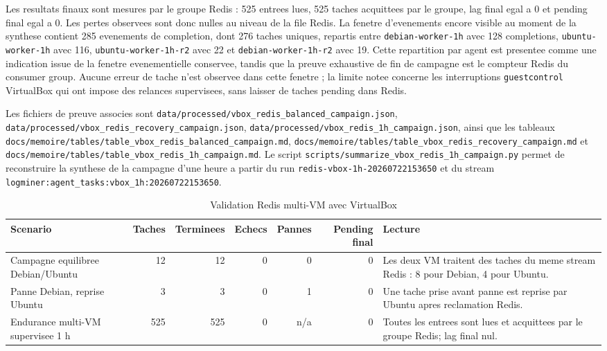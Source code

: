 Les resultats finaux sont mesures par le groupe Redis : 525 entrees lues, 525 taches acquittees par le groupe, lag final egal a 0 et pending final egal a 0. Les pertes observees sont donc nulles au niveau de la file Redis. La fenetre d'evenements encore visible au moment de la synthese contient 285 evenements de completion, dont 276 taches uniques, repartis entre \texttt{debian-worker-1h} avec 128 completions, \texttt{ubuntu-worker-1h} avec 116, \texttt{ubuntu-worker-1h-r2} avec 22 et \texttt{debian-worker-1h-r2} avec 19. Cette repartition par agent est presentee comme une indication issue de la fenetre evenementielle conservee, tandis que la preuve exhaustive de fin de campagne est le compteur Redis du consumer group. Aucune erreur de tache n'est observee dans cette fenetre ; la limite notee concerne les interruptions \texttt{guestcontrol} VirtualBox qui ont impose des relances supervisees, sans laisser de taches pending dans Redis.

Les fichiers de preuve associes sont \texttt{data/processed/vbox\_redis\_balanced\_campaign.json}, \texttt{data/processed/vbox\_redis\_recovery\_campaign.json}, \texttt{data/processed/vbox\_redis\_1h\_campaign.json}, ainsi que les tableaux \texttt{docs/memoire/tables/table\_vbox\_redis\_balanced\_campaign.md}, \texttt{docs/memoire/tables/table\_vbox\_redis\_recovery\_campaign.md} et \texttt{docs/memoire/tables/table\_vbox\_redis\_1h\_campaign.md}. Le script \texttt{scripts/summarize\_vbox\_redis\_1h\_campaign.py} permet de reconstruire la synthese de la campagne d'une heure a partir du run \texttt{redis-vbox-1h-20260722153650} et du stream \texttt{logminer:agent\_tasks:vbox\_1h:20260722153650}.

\begin{table}[H]
\centering
\caption{Validation Redis multi-VM avec VirtualBox}
\label{tab:vbox-redis-multivm}
\scriptsize
\begin{tabularx}{\textwidth}{p{3.2cm}rrrrrX}
\toprule
\textbf{Scenario} & \textbf{Taches} & \textbf{Terminees} & \textbf{Echecs} & \textbf{Pannes} & \textbf{Pending final} & \textbf{Lecture} \\
\midrule
Campagne equilibree Debian/Ubuntu & 12 & 12 & 0 & 0 & 0 & Les deux VM traitent des taches du meme stream Redis : 8 pour Debian, 4 pour Ubuntu. \\
Panne Debian, reprise Ubuntu & 3 & 3 & 0 & 1 & 0 & Une tache prise avant panne est reprise par Ubuntu apres reclamation Redis. \\
Endurance multi-VM supervisee 1 h & 525 & 525 & 0 & n/a & 0 & Toutes les entrees sont lues et acquittees par le groupe Redis; lag final nul. \\
\bottomrule
\end{tabularx}
\end{table}

